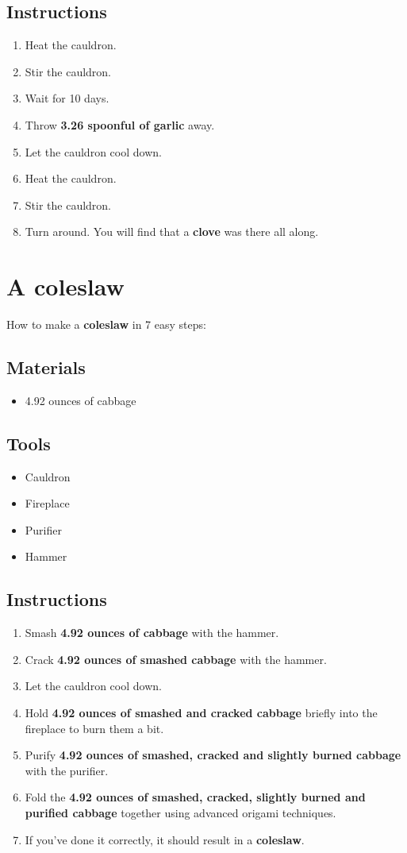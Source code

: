 \documentclass{article}
\begin{document}
\subsection{Instructions}\begin{enumerate}
\item 
Heat the cauldron.
\item 
Stir the cauldron.
\item 
Wait for 10 days.
\item 
Throw \textbf{3.26 spoonful of garlic} away.
\item 
Let the cauldron cool down.
\item 
Heat the cauldron.
\item 
Stir the cauldron.
\item 
Turn around. You will find that a \textbf{clove} was there all along.
\end{enumerate}
\newpage
\section{A coleslaw}How to make a \textbf{coleslaw} in 7 easy steps:

\subsection{Materials}\begin{itemize}
\item 
4.92 ounces of cabbage
\end{itemize}
\subsection{Tools}\begin{itemize}
\item 
Cauldron
\item 
Fireplace
\item 
Purifier
\item 
Hammer
\end{itemize}
\subsection{Instructions}\begin{enumerate}
\item 
Smash \textbf{4.92 ounces of cabbage} with the hammer.
\item 
Crack \textbf{4.92 ounces of smashed cabbage} with the hammer.
\item 
Let the cauldron cool down.
\item 
Hold \textbf{4.92 ounces of smashed and cracked cabbage} briefly into the fireplace to burn them a bit.
\item 
Purify \textbf{4.92 ounces of smashed, cracked and slightly burned cabbage} with the purifier.
\item 
Fold the \textbf{4.92 ounces of smashed, cracked, slightly burned and purified cabbage} together using advanced origami techniques.
\item 
If you've done it correctly, it should result in a \textbf{coleslaw}.
\end{enumerate}
\newpage
\end{document}
